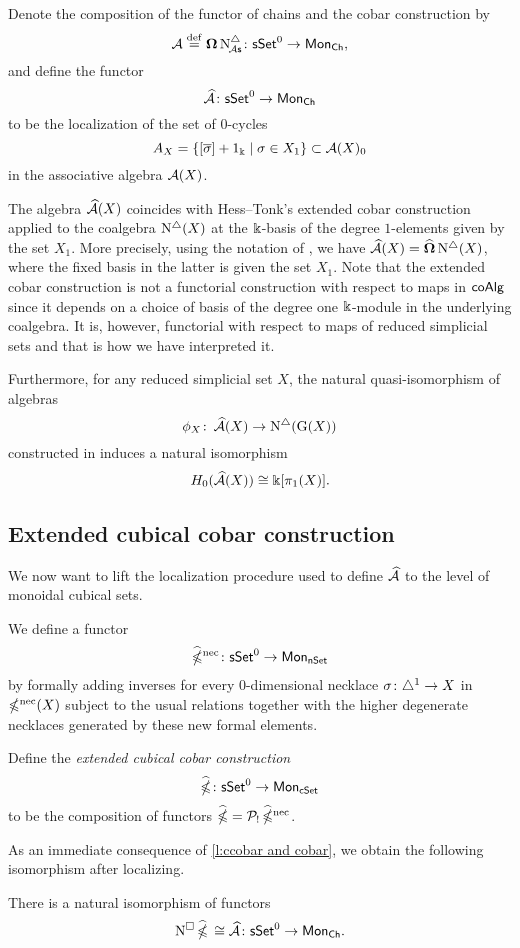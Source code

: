 Denote the composition of the functor of chains and the cobar construction by
\[
\operatorname{\mathcal{A}} \stackrel{\mathrm{def}}{=} \operatorname{\mathbf{\Omega}} \operatorname{N^{\triangle}_{\!{\mathcal{A}\mathsf{s}}}} \colon \mathsf{sSet}^0 \to \mathsf{Mon}_{\mathsf{Ch}},
\]
and define the functor
\[
\operatorname{\mathcal{\widehat{A}}} \colon \mathsf{sSet}^0 \to \mathsf{Mon}_{\mathsf{Ch}}
\]
to be the localization of the set of $0$-cycles
\[
A_X = \{ [\overline{\sigma}]+1_\Bbbk \mid \sigma \in X_1 \} \subset \operatorname{\mathcal{A}}(X)_0
\]
in the associative algebra $\operatorname{\mathcal{A}}(X)$.

The algebra $\operatorname{\mathcal{\widehat{A}}}(X)$ coincides with Hess--Tonk's extended cobar construction applied to the coalgebra $\operatorname{N^{\triangle}}(X)$ at the $\Bbbk$-basis of the degree $1$-elements given by the set $X_1$.
More precisely, using the notation of \cite{hess2010cobar}, we have $\operatorname{\mathcal{\widehat{A}}}(X) = \widehat{\operatorname{\mathbf{\Omega}}} \operatorname{N^{\triangle}}(X)$, where the fixed basis in the latter is given the set $X_1$.
Note that the extended cobar construction is not a functorial construction with respect to maps in $\mathsf{coAlg}$ since it depends on a choice of basis of the degree one $\Bbbk$-module in the underlying coalgebra.
It is, however, functorial with respect to maps of reduced simplicial sets and that is how we have interpreted it.

Furthermore, for any reduced simplicial set $X$, the natural quasi-isomorphism of algebras
\[
\phi_X \colon \operatorname{\mathcal{\widehat{A}}}(X) \to \operatorname{N^{\triangle}}(\operatorname{G}(X))
\]
constructed in \cite{hess2010cobar} induces a natural isomorphism
\[
H_0(\operatorname{\mathcal{\widehat{A}}}(X)) \cong \Bbbk[\pi_1(X)].
\]

\subsection{Extended cubical cobar construction} \label{ss:extended cubical cobar}

We now want to lift the localization procedure used to define $\operatorname{\mathcal{\widehat{A}}}$ to the level of monoidal cubical sets.

We define a functor
\[
\operatorname{\widehat{\mathbb{\Omega}}^{\mathrm{nec}}} \colon \mathsf{sSet}^0 \to \mathsf{Mon}_{\mathsf{nSet}}
\]
by formally adding inverses for every $0$-dimensional necklace $\sigma \colon \triangle^1 \to X$ in $\operatorname{\mathbb{\Omega}^{\mathrm{nec}}}(X)$ subject to the usual relations together with the higher degenerate necklaces generated by these new formal elements.

Define the \textit{extended cubical cobar construction}
\[
\operatorname{\widehat{\mathbb{\Omega}}} \colon \mathsf{sSet}^0 \to \mathsf{Mon}_{\mathsf{cSet}}
\]
to be the composition of functors $\operatorname{\widehat{\mathbb{\Omega}}} = \mathcal{P}_{!} \operatorname{\widehat{\mathbb{\Omega}}^{\mathrm{nec}}}$.

As an immediate consequence of \cref{l:ccobar and cobar}, we obtain the following isomorphism after localizing.

\begin{corollary}
	There is a natural isomorphism of functors
	\[
	\operatorname{N^{\square}} \operatorname{\widehat{\mathbb{\Omega}}} \, \cong \operatorname{\mathcal{\widehat{A}}} \colon \mathsf{sSet}^0 \to \mathsf{Mon}_{\mathsf{Ch}}.
	\]
\end{corollary}

